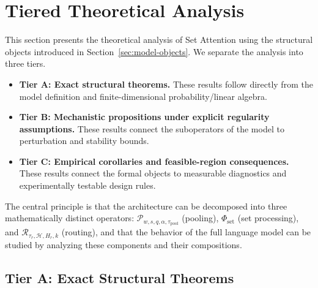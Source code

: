 \documentclass{article}
\theoremstyle{plain}
\theoremstyle{definition}
\theoremstyle{remark}
\begin{document}





\section{Tiered Theoretical Analysis}
\label{sec:theory}

This section presents the theoretical analysis of Set Attention using the structural objects introduced in Section~\ref{sec:model-objects}. We separate the analysis into three tiers.

\begin{itemize}
    \item \textbf{Tier A: Exact structural theorems.} These results follow directly from the model definition and finite-dimensional probability/linear algebra.
    \item \textbf{Tier B: Mechanistic propositions under explicit regularity assumptions.} These results connect the suboperators of the model to perturbation and stability bounds.
    \item \textbf{Tier C: Empirical corollaries and feasible-region consequences.} These results connect the formal objects to measurable diagnostics and experimentally testable design rules.
\end{itemize}

The central principle is that the architecture can be decomposed into three mathematically distinct operators:
$\mathcal{P}_{w,s,q,\alpha,\tau_{\mathrm{pool}}}$ (pooling), $\Phi_{\mathrm{set}}$ (set processing), and
$\mathcal{R}_{\tau_r,\mathcal{H},H_r,k}$ (routing), and that the behavior of the full language model can be studied by analyzing these components and their compositions.

\subsection{Tier A: Exact Structural Theorems}
\label{sec:tier-a}
\end{document}
